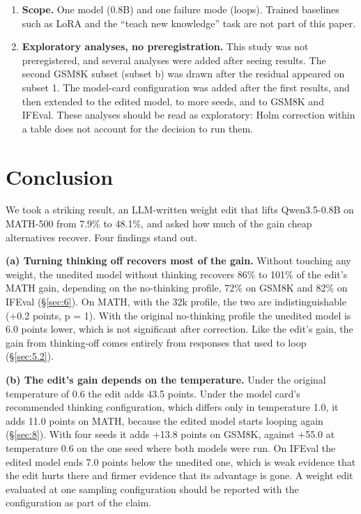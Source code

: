 \documentclass[11pt]{article}
\begin{document}
\begin{enumerate}[nosep,leftmargin=*]
\item \textbf{Scope.} One model (0.8B) and one failure mode (loops). Trained baselines such as LoRA \citep{hu2022} and the ``teach new knowledge'' task are not part of this paper.
\item \textbf{Exploratory analyses, no preregistration.} This study was not preregistered, and several analyses were added after seeing results. The second GSM8K subset (subset b) was drawn after the residual appeared on subset 1. The model-card configuration was added after the first results, and then extended to the edited model, to more seeds, and to GSM8K and IFEval. These analyses should be read as exploratory: Holm correction within a table does not account for the decision to run them.
\end{enumerate}

\section{Conclusion}\label{sec:13}

We took a striking result, an LLM-written weight edit that lifts Qwen3.5-0.8B on MATH-500 from 7.9\% to 48.1\%, and asked how much of the gain cheap alternatives recover. Four findings stand out.

\textbf{(a) Turning thinking off recovers most of the gain.} Without touching any weight, the unedited model without thinking recovers 86\% to 101\% of the edit's MATH gain, depending on the no-thinking profile, 72\% on GSM8K and 82\% on IFEval (\S\ref{sec:6}). On MATH, with the 32k profile, the two are indistinguishable (+0.2 points, p = 1). With the original no-thinking profile the unedited model is 6.0 points lower, which is not significant after correction. Like the edit's gain, the gain from thinking-off comes entirely from responses that used to loop (\S\ref{sec:5.2}).

\textbf{(b) The edit's gain depends on the temperature.} Under the original temperature of 0.6 the edit adds 43.5 points. Under the model card's recommended thinking configuration, which differs only in temperature 1.0, it adds 11.0 points on MATH, because the edited model starts looping again (\S\ref{sec:8}). With four seeds it adds +13.8 points on GSM8K, against +55.0 at temperature 0.6 on the one seed where both models were run. On IFEval the edited model ends 7.0 points below the unedited one, which is weak evidence that the edit hurts there and firmer evidence that its advantage is gone. A weight edit evaluated at one sampling configuration should be reported with the configuration as part of the claim.
\end{document}
